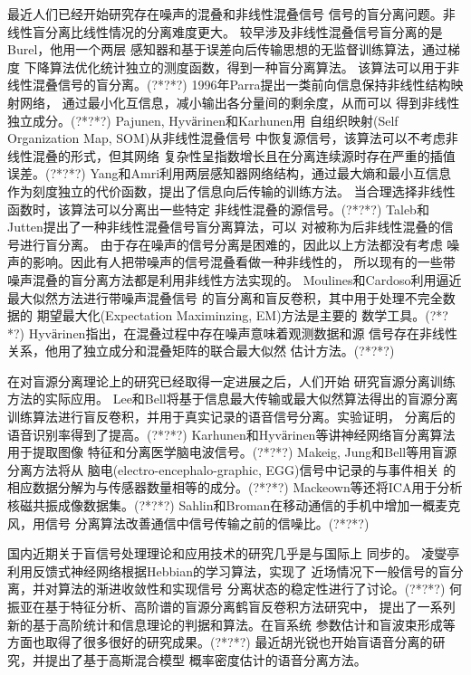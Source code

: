 最近人们已经开始研究存在噪声的混叠和非线性混叠信号
信号的盲分离问题。非线性盲分离比线性情况的分离难度更大。
较早涉及非线性混叠信号盲分离的是Burel，他用一个两层
感知器和基于误差向后传输思想的无监督训练算法，通过梯度
下降算法优化统计独立的测度函数，得到一种盲分离算法。
该算法可以用于非线性混叠信号的盲分离。(?*?*?)
1996年Parra提出一类前向信息保持非线性结构映射网络，
通过最小化互信息，减小输出各分量间的剩余度，从而可以
得到非线性独立成分。(?*?*?)
Pajunen, Hyvӓrinen和Karhunen用
自组织映射(Self Organization Map, SOM)从非线性混叠信号
中恢复源信号，该算法可以不考虑非线性混叠的形式，但其网络
复杂性呈指数增长且在分离连续源时存在严重的插值误差。(?*?*?)
Yang和Amri利用两层感知器网络结构，通过最大熵和最小互信息
作为刻度独立的代价函数，提出了信息向后传输的训练方法。
当合理选择非线性函数时，该算法可以分离出一些特定
非线性混叠的源信号。(?*?*?)
Taleb和Jutten提出了一种非线性混叠信号盲分离算法，可以
对被称为后非线性混叠的信号进行盲分离。
由于存在噪声的信号分离是困难的，因此以上方法都没有考虑
噪声的影响。因此有人把带噪声的信号混叠看做一种非线性的，
所以现有的一些带噪声混叠的盲分离方法都是利用非线性方法实现的。
Moulines和Cardoso利用逼近最大似然方法进行带噪声混叠信号
的盲分离和盲反卷积，其中用于处理不完全数据的
期望最大化(Expectation Maximinzing, EM)方法是主要的
数学工具。(?*?*?)
Hyvӓrinen指出，在混叠过程中存在噪声意味着观测数据和源
信号存在非线性关系，他用了独立成分和混叠矩阵的联合最大似然
估计方法。(?*?*?)

在对盲源分离理论上的研究已经取得一定进展之后，人们开始
研究盲源分离训练方法的实际应用。
Lee和Bell将基于信息最大传输或最大似然算法得出的盲源分离
训练算法进行盲反卷积，并用于真实记录的语音信号分离。实验证明，
分离后的语音识别率得到了提高。(?*?*?)
Karhunen和Hyvӓrinen等讲神经网络盲分离算法用于提取图像
特征和分离医学脑电波信号。(?*?*?)
Makeig, Jung和Bell等用盲源分离方法将从
脑电(electro-encephalo-graphic, EGG)信号中记录的与事件相关
的相应数据分解为与传感器数量相等的成分。(?*?*?)
Mackeown等还将ICA用于分析核磁共振成像数据集。(?*?*?)
Sahlin和Broman在移动通信的手机中增加一概麦克风，用信号
分离算法改善通信中信号传输之前的信噪比。(?*?*?)
	
国内近期关于盲信号处理理论和应用技术的研究几乎是与国际上
同步的。
凌燮亭利用反馈式神经网络根据Hebbian的学习算法，实现了
近场情况下一般信号的盲分离，并对算法的渐进收敛性和实现信号
分离状态的稳定性进行了讨论。(?*?*?)
何振亚在基于特征分析、高阶谱的盲源分离鹤盲反卷积方法研究中，
提出了一系列新的基于高阶统计和信息理论的判据和算法。在盲系统
参数估计和盲波束形成等方面也取得了很多很好的研究成果。(?*?*?)
最近胡光锐也开始盲语音分离的研究，并提出了基于高斯混合模型
概率密度估计的语音分离方法。

